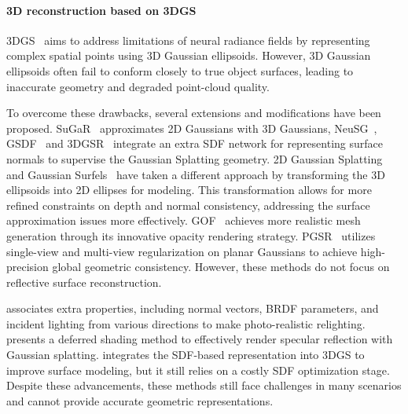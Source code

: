 \paragraph{\textbf{3D reconstruction based on 3DGS}\quad}
3DGS~\citep{kerbl20233d} aims to address limitations of  neural radiance fields by representing complex spatial points using 3D Gaussian ellipsoids. 
However, 3D Gaussian ellipsoids often fail to conform closely to true object surfaces, leading to inaccurate geometry and degraded point-cloud quality.

To overcome these drawbacks, several extensions and modifications have been proposed. SuGaR~\citep{guedon2024sugar} approximates 2D Gaussians with
3D Gaussians, NeuSG~\citep{chen2023neusg}, GSDF~\citep{yu2024gsdf} and 3DGSR~\citep{lyu20243dgsr} integrate an extra SDF network for representing surface normals to supervise the Gaussian Splatting geometry. 
2D Gaussian Splatting~\citep{huang20242d} and Gaussian Surfels~\citep{dai2024high} have taken a different approach by transforming the 3D ellipsoids into 2D ellipses for modeling. This transformation allows for more refined constraints on depth and normal consistency, addressing the surface approximation issues more effectively. 
GOF~\citep{yu2024gaussian} achieves more realistic mesh generation through its innovative opacity rendering strategy.
PGSR~\citep{chen2024pgsr} utilizes single-view and multi-view regularization on planar Gaussians to achieve high-precision global geometric consistency.
However, these methods do not focus on reflective surface reconstruction.


\relight associates extra properties, including normal vectors, BRDF parameters,
and incident lighting from various directions to make photo-realistic relighting. 
\dr presents a deferred shading method to effectively render specular reflection with Gaussian splatting. 
\gsror integrates the SDF-based representation into 3DGS to improve surface modeling, but it still relies on a costly SDF optimization stage.
Despite these advancements, these methods still face challenges in many scenarios and cannot provide accurate geometric representations.
\vspace{-1.5em}

